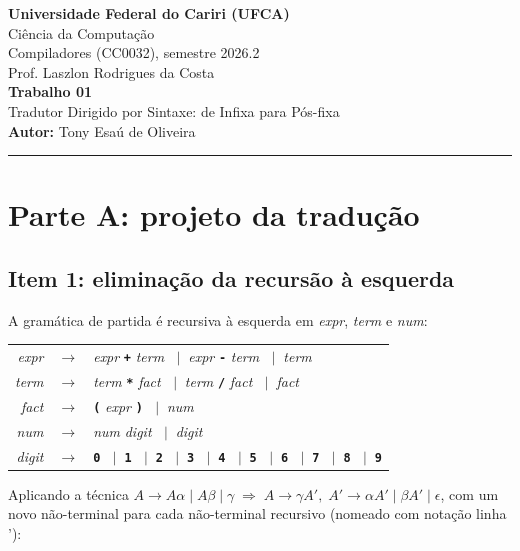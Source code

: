 \documentclass[11pt,a4paper]{article}
\newcommand{\nt}[1]{\textit{#1}}                 %
\newcommand{\tm}[1]{\texttt{\textbf{#1}}}        %
\newcommand{\pr}{\ensuremath{\rightarrow}}
\newcommand{\ou}{\ensuremath{\;\mid\;}}
\begin{document}
	
	\begin{center}
		{\large\textbf{Universidade Federal do Cariri (UFCA)}}\\[2pt]
		Ciência da Computação\\
		Compiladores (CC0032), semestre 2026.2\\
		Prof. Laszlon Rodrigues da Costa\\[10pt]
		{\Large\textbf{Trabalho 01}}\\[2pt]
		{\large Tradutor Dirigido por Sintaxe: de Infixa para Pós-fixa}\\[10pt]
		\textbf{Autor:} Tony Esaú de Oliveira 
	\end{center}
	
	\vspace{4pt}
	\hrule
	\vspace{6pt}
	
	\section{Parte A: projeto da tradução}
	
	\subsection{Item 1: eliminação da recursão à esquerda}
	
	A gramática de partida é recursiva à esquerda em \nt{expr}, \nt{term} e \nt{num}:
	
	\begin{center}
		\begin{tabular}{r@{\;\;}c@{\;\;}l}
			\nt{expr}  & \pr & \nt{expr} \tm{+} \nt{term} \ou \nt{expr} \tm{-} \nt{term} \ou \nt{term} \\
			\nt{term}  & \pr & \nt{term} \tm{*} \nt{fact} \ou \nt{term} \tm{/} \nt{fact} \ou \nt{fact} \\
			\nt{fact}  & \pr & \tm{(} \nt{expr} \tm{)} \ou \nt{num} \\
			\nt{num}   & \pr & \nt{num} \nt{digit} \ou \nt{digit} \\
			\nt{digit} & \pr & \tm{0} \ou \tm{1} \ou \tm{2} \ou \tm{3} \ou \tm{4} \ou \tm{5} \ou \tm{6} \ou \tm{7} \ou \tm{8} \ou \tm{9}
		\end{tabular}
	\end{center}
	
	Aplicando a técnica $A \pr A\alpha \mid A\beta \mid \gamma \;\Rightarrow\; A \pr \gamma A', \; A' \pr \alpha A' \mid \beta A' \mid \epsilon$, com um novo não-terminal para cada não-terminal recursivo (nomeado com notação linha '):
	
\end{document}
